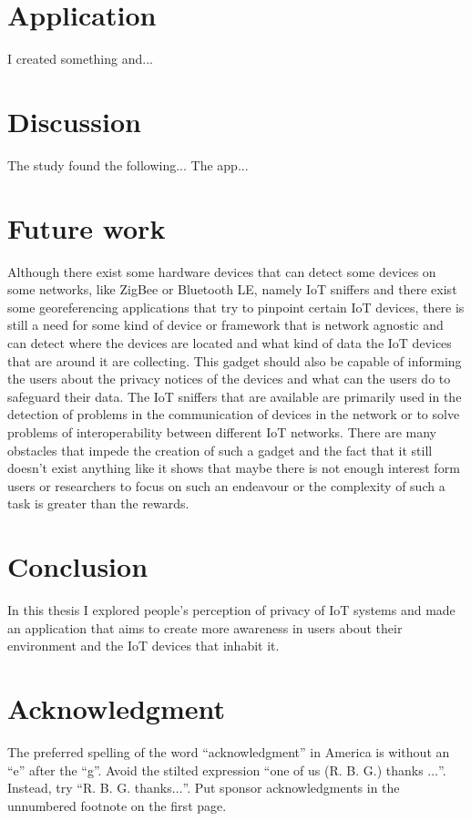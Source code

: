 \documentclass[conference]{IEEEtran}
\begin{document}
\section{Application}

I created something and...

\section{Discussion}

The study found the following... The app...

\section{Future work}

Although there exist some hardware devices that can detect some devices
on some networks, like ZigBee or Bluetooth LE, namely IoT sniffers and
there exist some georeferencing applications that try to pinpoint certain
IoT devices, there is still a need for some kind of device or framework
that is network agnostic and can detect where the devices are located and
what kind of data the IoT devices that are around it are collecting.
This gadget should also be capable of informing the users about the privacy
notices of the devices and what can the users do to safeguard their data.
The IoT sniffers that are available are primarily used in the detection of
problems in the communication of devices in the network or to solve problems
of interoperability between different IoT networks. There are many obstacles
that impede the creation of such a gadget and the fact that it still doesn't
exist anything like it shows that maybe there is not enough interest form
users or researchers to focus on such an endeavour or the complexity
of such a task is greater than the rewards.

\section{Conclusion}

In this thesis I explored people's perception of privacy of IoT systems and
made an application that aims to create more awareness in users about their
environment and the IoT devices that inhabit it.

\section*{Acknowledgment}

The preferred spelling of the word ``acknowledgment'' in America is without
an ``e'' after the ``g''. Avoid the stilted expression ``one of us (R. B.
G.) thanks $\ldots$''. Instead, try ``R. B. G. thanks$\ldots$''. Put sponsor
acknowledgments in the unnumbered footnote on the first page.



\end{document}
